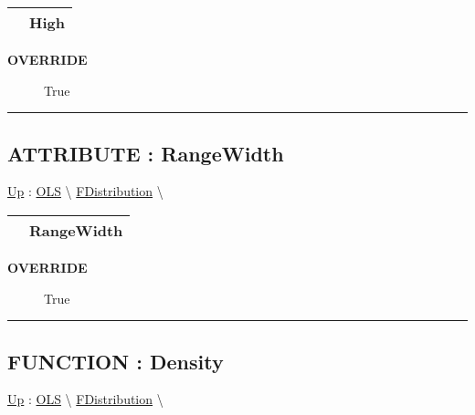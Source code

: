 {\renewcommand{\arraystretch}{1.5}
\begin{tabularx}{\textwidth}{|>{\raggedright\arraybackslash}l|X|}
\hline
\hspace{0pt} & High \\
\hline
\end{tabularx}
}

\par

\par
\begin{description}
\item [\textbf{OVERRIDE}] True
\end{description}

\rule{\linewidth}{0.5pt}
\subsection*{ATTRIBUTE : RangeWidth}
\hypertarget{ecldoc:linearregression.ols.fdistribution.rangewidth}{}
\hyperlink{ecldoc:linearregression.ols.fdistribution}{Up} :
\hspace{0pt} \hyperlink{ecldoc:linearregression.ols}{OLS} \textbackslash 
\hspace{0pt} \hyperlink{ecldoc:linearregression.ols.fdistribution}{FDistribution} \textbackslash 

{\renewcommand{\arraystretch}{1.5}
\begin{tabularx}{\textwidth}{|>{\raggedright\arraybackslash}l|X|}
\hline
\hspace{0pt} & RangeWidth \\
\hline
\end{tabularx}
}

\par

\par
\begin{description}
\item [\textbf{OVERRIDE}] True
\end{description}

\rule{\linewidth}{0.5pt}
\subsection*{FUNCTION : Density}
\hypertarget{ecldoc:linearregression.ols.fdistribution.density}{}
\hyperlink{ecldoc:linearregression.ols.fdistribution}{Up} :
\hspace{0pt} \hyperlink{ecldoc:linearregression.ols}{OLS} \textbackslash 
\hspace{0pt} \hyperlink{ecldoc:linearregression.ols.fdistribution}{FDistribution} \textbackslash 

